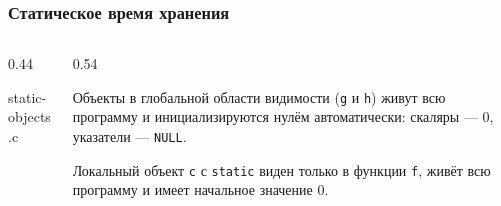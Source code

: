 \documentclass[compress, 8pt, aspectratio=169]{beamer}
\begin{document}
\begin{frame}[fragile]

    \frametitle{Статическое время хранения}

    \begin{columns}[T]

        \begin{column}{0.44\textwidth}

                {static-objects.c}

        \end{column}

        \begin{column}{0.54\textwidth}

            \begin{myitemize}
                \footnotesize

                \item Объекты в глобальной области видимости
                    (\texttt{g} и \texttt{h}) живут всю
                    программу и инициализируются нулём
                    автоматически: скаляры --- 0, указатели
                    --- \texttt{NULL}.

                \item Локальный объект \texttt{c} с \texttt{static}
                    виден только в функции \texttt{f}, живёт всю
                    программу и имеет начальное значение 0.

            \end{myitemize}

        \end{column}

    \end{columns}

\end{frame}
\end{document}
